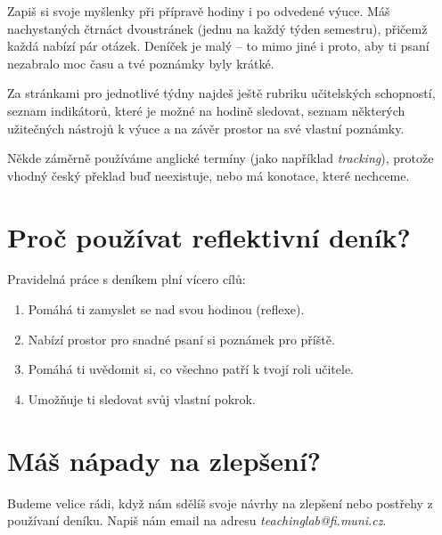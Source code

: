 Zapiš si svoje myšlenky při přípravě hodiny i po odvedené výuce. Máš nachystaných čtrnáct dvoustránek (jednu na každý týden semestru), přičemž každá nabízí pár otázek. Deníček je malý -- to mimo jiné i proto, aby ti psaní nezabralo moc času a tvé poznámky byly krátké.

Za stránkami pro jednotlivé týdny najdeš ještě rubriku učitelských schopností, seznam indikátorů, které je možné na hodině sledovat, seznam některých užitečných nástrojů k výuce a na závěr prostor na své vlastní poznámky.

Někde záměrně používáme anglické termíny (jako například \textit{tracking}), protože vhodný český překlad buď neexistuje, nebo má konotace, které nechceme.

\section*{Proč používat reflektivní deník?}

Pravidelná práce s deníkem plní vícero cílů:
\begin{enumerate}[topsep=0pt]
\item Pomáhá ti zamyslet se nad svou hodinou (reflexe).
\item Nabízí prostor pro snadné psaní si poznámek pro příště.
\item Pomáhá ti uvědomit si, co všechno patří k tvojí roli učitele.
\item Umožňuje ti sledovat svůj vlastní pokrok.
\end{enumerate}

\section*{Máš nápady na zlepšení?}

Budeme velice rádi, když nám sdělíš svoje návrhy na zlepšení nebo postřehy z používaní deníku. Napiš nám email na adresu \textit{teachinglab@fi.muni.cz}.
